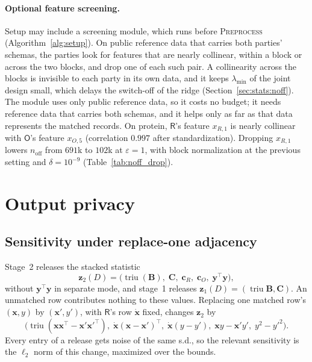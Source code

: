 \documentclass[11pt]{article}
\theoremstyle{definition}
\theoremstyle{plain}
\newcommand{\by}{\mathbf{y}}
\newcommand{\bx}{\mathbf{x}}
\newcommand{\bxd}{\dot{\mathbf{x}}}
\newcommand{\bB}{\mathbf{B}}
\newcommand{\bC}{\mathbf{C}}
\newcommand{\bcR}{\mathbf{c}_{R}}
\newcommand{\bcO}{\mathbf{c}_{O}}
\newcommand{\Party}[1]{\textsf{#1}}
\newcommand{\Rp}{\Party{R}}
\newcommand{\Op}{\Party{O}}
\DeclareMathOperator{\triu}{triu}
\begin{document}
\paragraph{Optional feature screening.} Setup may include a screening module, which runs before \textsc{Preprocess} (Algorithm~\ref{alg:setup}). On public reference data that carries both parties' schemas, the parties look for features that are nearly collinear, within a block or across the two blocks, and drop one of each such pair. A collinearity across the blocks is invisible to each party in its own data, and it keeps $\lambda_{\min}$ of the joint design small, which delays the switch-off of the ridge (Section~\ref{sec:stats:noff}). The module uses only public reference data, so it costs no budget; it needs reference data that carries both schemas, and it helps only as far as that data represents the matched records. On protein, $\Rp$'s feature $x_{R,1}$ is nearly collinear with $\Op$'s feature $x_{O,5}$ (correlation $0.997$ after standardization). Dropping $x_{R,1}$ lowers $n_{\mathrm{off}}$ from $691$k to $102$k at $\varepsilon = 1$, with block normalization at the previous setting and $\delta = 10^{-9}$ (Table~\ref{tab:noff_drop}).

\clearpage  %

\section{Output privacy}
\label{sec:privacy}

\subsection{Sensitivity under replace-one adjacency}
\label{sec:privacy:sens}

Stage~2 releases the stacked statistic
\begin{equation}
  \mathbf z_2(D) = \bigl(\triu(\bB),\; \bC,\; \bcR,\; \bcO,\; \by^{\top}\by\bigr),
  \label{eq:release}
\end{equation}
without $\by^\top\by$ in separate mode, and stage~1 releases $\mathbf z_1(D) = (\triu\bB, \bC)$. An unmatched row contributes nothing to these values. Replacing one matched row's $(\bx, y)$ by $(\bx', y')$, with $\Rp$'s row $\bxd$ fixed, changes $\mathbf z_2$ by
\[
  \bigl(\triu(\bx\bx^{\top} - \bx'\bx'^{\top}),\;
  \bxd(\bx - \bx')^{\top},\;
  \bxd(y - y'),\;
  \bx y - \bx'y',\;
  y^{2} - y'^{2}\bigr).
\]
Every entry of a release gets noise of the same s.d., so the relevant sensitivity is the $\ell_2$ norm of this change, maximized over the bounds.
\end{document}
